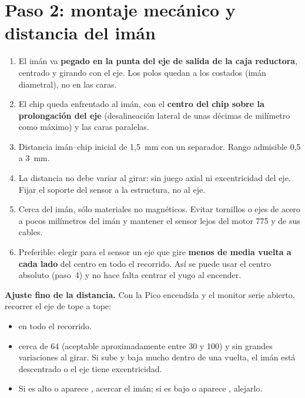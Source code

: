 \documentclass[11pt,a4paper]{article}
\newcommand{\code}[1]{\texttt{\detokenize{#1}}}
\newcommand{\casilla}{$\square$\ }
\begin{document}
\section{Paso 2: montaje mecánico y distancia del imán}
\begin{center}
\end{center}
\begin{enumerate}
\item El imán va \textbf{pegado en la punta del eje de salida de la caja reductora}, centrado y girando con el eje. Los polos quedan a los costados (imán diametral), no en las caras.
\item El chip queda enfrentado al imán, con el \textbf{centro del chip sobre la prolongación del eje} (desalineación lateral de unas décimas de milímetro como máximo) y las caras paralelas.
\item Distancia imán--chip inicial de 1,5~mm con un separador. Rango admisible 0,5 a 3~mm.
\item La distancia no debe variar al girar: sin juego axial ni excentricidad del eje. Fijar el soporte del sensor a la estructura, no al eje.
\item Cerca del imán, sólo materiales no magnéticos. Evitar tornillos o ejes de acero a pocos milímetros del imán y mantener el sensor lejos del motor 775 y de sus cables.
\item Preferible: elegir para el sensor un eje que gire \textbf{menos de media vuelta a cada lado} del centro en todo el recorrido. Así se puede usar el centro absoluto (paso~4) y no hace falta centrar el yugo al encender.
\end{enumerate}

\textbf{Ajuste fino de la distancia.} Con la Pico encendida y el monitor serie abierto, recorrer el eje de tope a tope:
\begin{itemize}
\item[\casilla] \code{s=OK} en todo el recorrido.
\item[\casilla] \code{g=} cerca de 64 (aceptable aproximadamente entre 30 y 100) y sin grandes variaciones al girar. Si \code{g} sube y baja mucho dentro de una vuelta, el imán está descentrado o el eje tiene excentricidad.
\item[\casilla] Si \code{g} es alto o aparece \code{DEB}, acercar el imán; si es bajo o aparece \code{FUE}, alejarlo.
\end{itemize}
\end{document}
